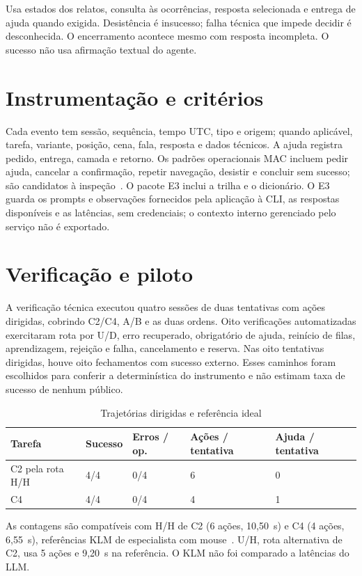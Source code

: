 \documentclass[conference,a4paper]{IEEEtran}
\begin{document}
 Usa estados dos relatos, consulta às ocorrências, resposta selecionada e entrega de ajuda quando exigida. Desistência é insucesso; falha técnica que impede decidir é desconhecida. O encerramento acontece mesmo com resposta incompleta. O sucesso não usa afirmação textual do agente.

\section{Instrumentação e critérios}
Cada evento tem sessão, sequência, tempo UTC, tipo e origem; quando aplicável, tarefa, variante, posição, cena, fala, resposta e dados técnicos. A ajuda registra pedido, entrega, camada e retorno. Os padrões operacionais MAC incluem pedir ajuda, cancelar a confirmação, repetir navegação, desistir e concluir sem sucesso; são candidatos à inspeção~\cite[pp. 31--38]{mac}. O pacote E3 inclui a trilha e o dicionário. O E3 guarda os prompts e observações fornecidos pela aplicação à CLI, as respostas disponíveis e as latências, sem credenciais; o contexto interno gerenciado pelo serviço não é exportado.

\section{Verificação e piloto}
A verificação técnica executou quatro sessões de duas tentativas com ações dirigidas, cobrindo C2/C4, A/B e as duas ordens. Oito verificações automatizadas exercitaram rota por U/D, erro recuperado, obrigatório de ajuda, reinício de filas, aprendizagem, rejeição e falha, cancelamento e reserva. Nas oito tentativas dirigidas, houve oito fechamentos com sucesso externo. Esses caminhos foram escolhidos para conferir a determinística do instrumento e não estimam taxa de sucesso de nenhum público.

\begin{table}[ht]
\caption{Trajetórias dirigidas e referência ideal}\small
\begin{tabularx}{\columnwidth}{@{}lYYYY@{}}\toprule
Tarefa & Sucesso & Erros / op. & Ações / tentativa & Ajuda / tentativa\\\midrule
C2 pela rota H/H & 4/4 & 0/4 & 6 & 0\\
C4 & 4/4 & 0/4 & 4 & 1\\\bottomrule
\end{tabularx}
\end{table}

As contagens são compatíveis com H/H de C2 (6 ações, 10,50~s) e C4 (4 ações, 6,55~s), referências KLM de especialista com mouse~\cite[pp. 397--400]{card}. U/H, rota alternativa de C2, usa 5 ações e 9,20~s na referência. O KLM não foi comparado a latências do LLM. 

\end{document}
